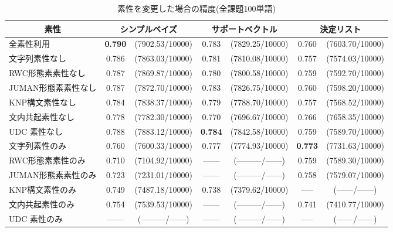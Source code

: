 \begin{table*}[t]
\caption{素性を変更した場合の精度(全課題100単語)}
\label{tab:sosei_change}
  \begin{center}
\small\renewcommand{\arraystretch}{}
\begin{tabular}[c]{|l@{ }|c@{ }c@{ }|c@{ }c@{ }|c@{ }c@{ }|}\hline
\multicolumn{1}{|c|}{素性}  & \multicolumn{2}{|c|}{シンプルベイズ} & \multicolumn{2}{|c|}{サポートベクトル} & \multicolumn{2}{|c|}{決定リスト}  \\\hline
全素性利用          & {\bf 0.790}  & (7902.53/10000) & 0.783  & (7829.25/10000) & 0.760  & (7603.70/10000) \\\hline
文字列素性なし      & 0.786  & (7863.03/10000) & 0.781  & (7810.08/10000) & 0.757  & (7574.03/10000) \\
RWC形態素素性なし   & 0.787  & (7869.87/10000) & 0.780  & (7800.58/10000) & 0.759  & (7592.70/10000) \\
JUMAN形態素素性なし & 0.787  & (7872.70/10000) & 0.783  & (7826.75/10000) & 0.760  & (7598.20/10000) \\
KNP構文素性なし     & 0.784  & (7838.37/10000) & 0.779  & (7788.70/10000) & 0.757  & (7568.52/10000) \\
文内共起素性なし    & 0.778  & (7782.30/10000) & 0.770  & (7696.67/10000) & 0.766  & (7658.35/10000) \\
UDC 素性なし        & 0.788  & (7883.12/10000) & {\bf 0.784}  & (7842.58/10000) & 0.759  & (7589.70/10000) \\\hline
文字列素性のみ      & 0.760  & (7600.33/10000) & 0.777  & (7774.93/10000) & {\bf 0.773}  & (7731.63/10000) \\
RWC形態素素性のみ   & 0.710  & (7104.92/10000) & ------ & (---------/------) & 0.759  & (7589.30/10000)  \\
JUMAN形態素素性のみ & 0.723  & (7231.01/10000) & ------ & (---------/------) & 0.758  & (7579.07/10000) \\
KNP構文素性のみ     & 0.749  & (7487.18/10000) & 0.738  & (7379.62/10000) & -----  & (------/------) \\
文内共起素性のみ    & 0.754  & (7539.53/10000) & ------ & (---------/------) & 0.741  & (7410.77/10000) \\
UDC 素性のみ        & ------ & (---------/------) & ------ & (---------/------) & -----  & (------/------) \\\hline
\end{tabular}
\end{center}
\end{table*}

